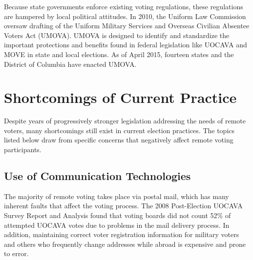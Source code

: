 

Because state governments enforce existing voting regulations, these
regulations are hampered by local political attitudes. In 2010, the
Uniform Law Commission oversaw drafting of the Uniform Military
Services and Overseas Civilian Absentee Voters Act (UMOVA). UMOVA is
designed to identify and standardize the important protections and
benefits found in federal legislation like UOCAVA and MOVE in state
and local elections. As of April 2015, fourteen states and the
District of Columbia have enacted UMOVA.

\section{Shortcomings of Current Practice}

Despite years of progressively stronger legislation addressing the
needs of remote voters, many shortcomings still exist in current
election practices. The topics listed below draw from specific
concerns that negatively affect remote voting participants.

\subsection{Use of Communication Technologies}
The majority of remote voting takes place via postal mail, which has
many inherent faults that affect the voting process. The 2008
Post-Election UOCAVA Survey Report and Analysis found that voting
boards did not count 52\% of attempted UOCAVA votes due to problems in
the mail delivery process. In addition, maintaining correct voter
registration information for military voters and others who frequently
change addresses while abroad is expensive and prone to error.


